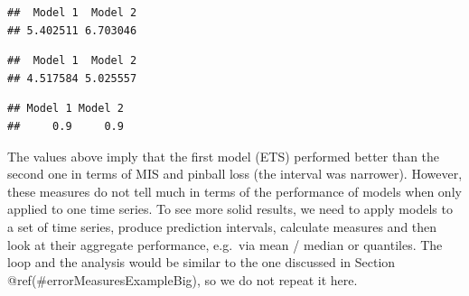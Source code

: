 \documentclass[
]{book}
\newenvironment{Shaded}{\begin{snugshade}}{\end{snugshade}}
\newcommand{\CommentTok}[1]{\textcolor[rgb]{0.56,0.35,0.01}{\textit{#1}}}
\newcommand{\FloatTok}[1]{\textcolor[rgb]{0.00,0.00,0.81}{#1}}
\newcommand{\FunctionTok}[1]{\textcolor[rgb]{0.00,0.00,0.00}{#1}}
\newcommand{\NormalTok}[1]{#1}
\newcommand{\SpecialCharTok}[1]{\textcolor[rgb]{0.00,0.00,0.00}{#1}}
\newcommand{\StringTok}[1]{\textcolor[rgb]{0.31,0.60,0.02}{#1}}
\theoremstyle{definition}
\theoremstyle{definition}
\theoremstyle{definition}
\theoremstyle{definition}
\theoremstyle{remark}
\begin{document}
\begin{verbatim}
##  Model 1  Model 2 
## 5.402511 6.703046
\end{verbatim}

\begin{Shaded}
\end{Shaded}

\begin{verbatim}
##  Model 1  Model 2 
## 4.517584 5.025557
\end{verbatim}

\begin{Shaded}
\end{Shaded}

\begin{verbatim}
## Model 1 Model 2 
##     0.9     0.9
\end{verbatim}

The values above imply that the first model (ETS) performed better than the second one in terms of MIS and pinball loss (the interval was narrower). However, these measures do not tell much in terms of the performance of models when only applied to one time series. To see more solid results, we need to apply models to a set of time series, produce prediction intervals, calculate measures and then look at their aggregate performance, e.g.~via mean / median or quantiles. The loop and the analysis would be similar to the one discussed in Section @ref(\#errorMeasuresExampleBig), so we do not repeat it here.
\end{document}

